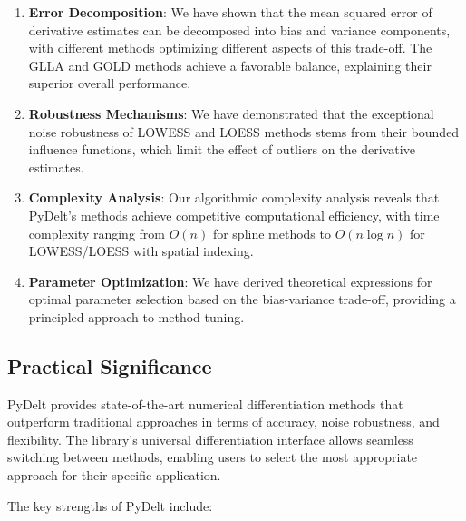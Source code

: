 \documentclass[10pt,journal,compsoc]{IEEEtran}
\begin{document}
\begin{enumerate}
    \item \textbf{Error Decomposition}: We have shown that the mean squared error of derivative estimates can be decomposed into bias and variance components, with different methods optimizing different aspects of this trade-off. The GLLA and GOLD methods achieve a favorable balance, explaining their superior overall performance.
    
    \item \textbf{Robustness Mechanisms}: We have demonstrated that the exceptional noise robustness of LOWESS and LOESS methods stems from their bounded influence functions, which limit the effect of outliers on the derivative estimates.
    
    \item \textbf{Complexity Analysis}: Our algorithmic complexity analysis reveals that PyDelt's methods achieve competitive computational efficiency, with time complexity ranging from $O(n)$ for spline methods to $O(n \log n)$ for LOWESS/LOESS with spatial indexing.
    
    \item \textbf{Parameter Optimization}: We have derived theoretical expressions for optimal parameter selection based on the bias-variance trade-off, providing a principled approach to method tuning.
\end{enumerate}

\subsection{Practical Significance}

PyDelt provides state-of-the-art numerical differentiation methods that outperform traditional approaches in terms of accuracy, noise robustness, and flexibility. The library's universal differentiation interface allows seamless switching between methods, enabling users to select the most appropriate approach for their specific application.

The key strengths of PyDelt include:
\end{document}
